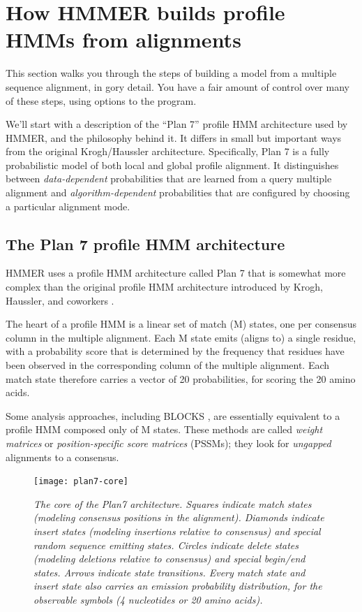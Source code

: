 \section{How HMMER builds profile HMMs from alignments}

This section walks you through the steps of building a model from a
multiple sequence alignment, in gory detail. You have a fair amount of
control over many of these steps, using options to the 
program.

We'll start with a description of the ``Plan 7'' profile HMM
architecture used by HMMER, and the philosophy behind it. It differs
in small but important ways from the original Krogh/Haussler
architecture. Specifically, Plan 7 is a fully probabilistic model of
both local and global profile alignment. It distinguishes between
\emph{data-dependent} probabilities that are learned from a query
multiple alignment and \emph{algorithm-dependent} probabilities that
are configured by choosing a particular alignment mode.

\subsection{The Plan 7 profile HMM architecture}

HMMER uses a profile HMM architecture called Plan 7 that is somewhat
more complex than the original profile HMM architecture introduced by
Krogh, Haussler, and coworkers \citep{Krogh94}.

The heart of a profile HMM is a linear set of match (M) states, one
per consensus column in the multiple alignment. Each M state emits
(aligns to) a single residue, with a probability score that is
determined by the frequency that residues have been observed in the
corresponding column of the multiple alignment. Each match state
therefore carries a vector of 20 probabilities, for scoring the 20
amino acids.

Some analysis approaches, including BLOCKS \citep{Henikoff94}, are
essentially equivalent to a profile HMM composed only of M states.
These methods are called \emph{weight matrices} or
\emph{position-specific score matrices} (PSSMs); they look for
\emph{ungapped} alignments to a consensus.

\begin{figure}[t]
\texttt{[image: plan7-core]}
\caption{\textit{The core of the Plan7 architecture. Squares indicate
match states (modeling consensus positions in the alignment).
Diamonds indicate insert states (modeling insertions relative to
consensus) and special random sequence emitting states. Circles
indicate delete states (modeling deletions relative to consensus) and
special begin/end states. Arrows indicate state transitions. Every
match state and insert state also carries an emission probability
distribution, for the observable symbols (4 nucleotides or 20 amino
acids).}}
\end{figure}

